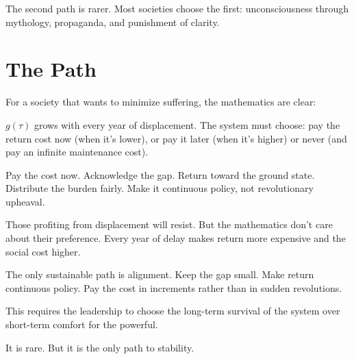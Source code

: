 \documentclass[12pt]{article}
\begin{document}
The second path is rarer. Most societies choose the first: unconsciousness through mythology, propaganda, and punishment of clarity.

\section{The Path}

For a society that wants to minimize suffering, the mathematics are clear:

$g(\tau)$ grows with every year of displacement. The system must choose: pay the return cost now (when it's lower), or pay it later (when it's higher) or never (and pay an infinite maintenance cost).

Pay the cost now. Acknowledge the gap. Return toward the ground state. Distribute the burden fairly. Make it continuous policy, not revolutionary upheaval.

Those profiting from displacement will resist. But the mathematics don't care about their preference. Every year of delay makes return more expensive and the social cost higher.

The only sustainable path is alignment. Keep the gap small. Make return continuous policy. Pay the cost in increments rather than in sudden revolutions.

This requires the leadership to choose the long-term survival of the system over short-term comfort for the powerful.

It is rare. But it is the only path to stability.
\end{document}
